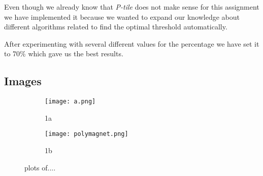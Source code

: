 \documentclass[12]{article}
\begin{document}
Even though we already know that \textit{P-tile} does not make sense for this assignment we have implemented it because we wanted to expand our knowledge about different algorithms related to find the optimal threshold automatically. 

After experimenting with several different values for the percentage we have set it to 70\% which gave us the best results. 

\subsection{Images}

\begin{figure}[H]
\begin{subfigure}{.5\textwidth}
  \centering
  \texttt{[image: a.png]}
  \caption{1a}
  \label{fig:sfig1}
\end{subfigure}%
\begin{subfigure}{.5\textwidth}
  \centering
  \texttt{[image: polymagnet.png]}
  \caption{1b}
  \label{fig:sfig2}
\end{subfigure}
\caption{plots of....}
\label{fig:fig}
\end{figure}
\end{document}
